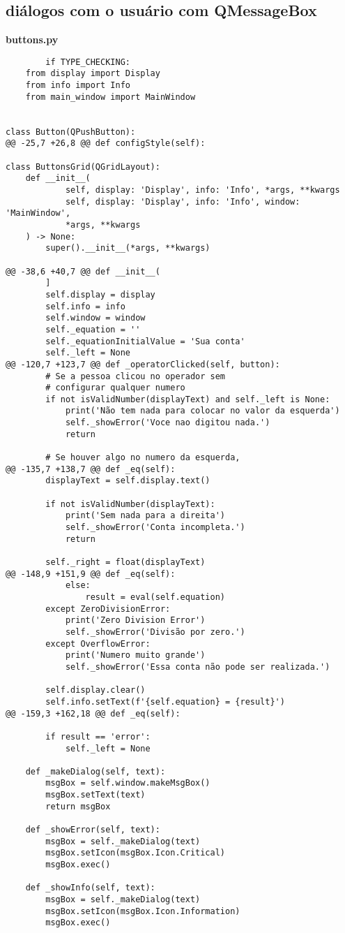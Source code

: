 \documentclass[12pt,a4paper]{article}
\begin{document}
\subsection{diálogos com o usuário com QMessageBox}
    \textbf{buttons.py}
    \begin{lstlisting}
        if TYPE_CHECKING:
    from display import Display
    from info import Info
    from main_window import MainWindow


class Button(QPushButton):
@@ -25,7 +26,8 @@ def configStyle(self):

class ButtonsGrid(QGridLayout):
    def __init__(
            self, display: 'Display', info: 'Info', *args, **kwargs
            self, display: 'Display', info: 'Info', window: 'MainWindow',
            *args, **kwargs
    ) -> None:
        super().__init__(*args, **kwargs)

@@ -38,6 +40,7 @@ def __init__(
        ]
        self.display = display
        self.info = info
        self.window = window
        self._equation = ''
        self._equationInitialValue = 'Sua conta'
        self._left = None
@@ -120,7 +123,7 @@ def _operatorClicked(self, button):
        # Se a pessoa clicou no operador sem
        # configurar qualquer numero
        if not isValidNumber(displayText) and self._left is None:
            print('Não tem nada para colocar no valor da esquerda')
            self._showError('Voce nao digitou nada.')
            return

        # Se houver algo no numero da esquerda,
@@ -135,7 +138,7 @@ def _eq(self):
        displayText = self.display.text()

        if not isValidNumber(displayText):
            print('Sem nada para a direita')
            self._showError('Conta incompleta.')
            return

        self._right = float(displayText)
@@ -148,9 +151,9 @@ def _eq(self):
            else:
                result = eval(self.equation)
        except ZeroDivisionError:
            print('Zero Division Error')
            self._showError('Divisão por zero.')
        except OverflowError:
            print('Numero muito grande')
            self._showError('Essa conta não pode ser realizada.')

        self.display.clear()
        self.info.setText(f'{self.equation} = {result}')
@@ -159,3 +162,18 @@ def _eq(self):

        if result == 'error':
            self._left = None

    def _makeDialog(self, text):
        msgBox = self.window.makeMsgBox()
        msgBox.setText(text)
        return msgBox

    def _showError(self, text):
        msgBox = self._makeDialog(text)
        msgBox.setIcon(msgBox.Icon.Critical)
        msgBox.exec()

    def _showInfo(self, text):
        msgBox = self._makeDialog(text)
        msgBox.setIcon(msgBox.Icon.Information)
        msgBox.exec()
    \end{lstlisting}
\end{document}
